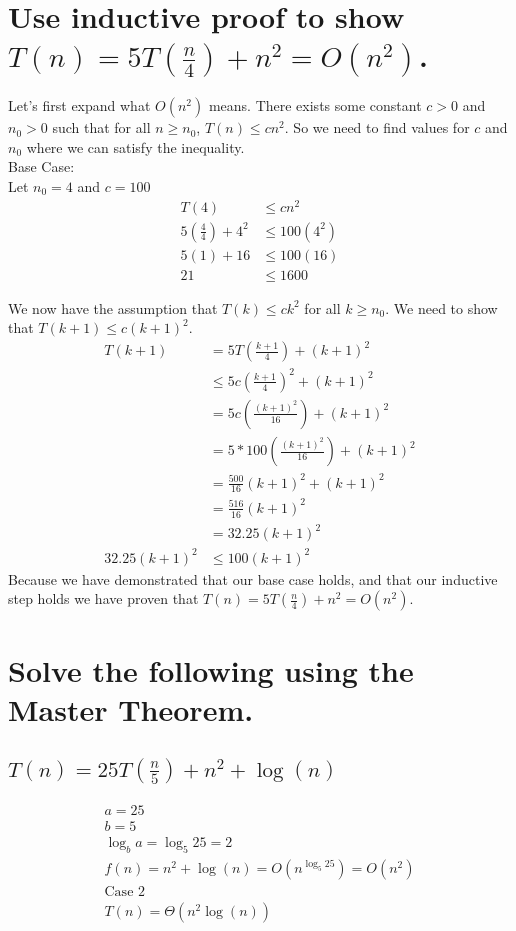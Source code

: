 \documentclass{article}
\begin{document}
\section{Use inductive proof to show \(T(n) = 5T(\frac{n}{4}) + n^2 = O(n^2)\).}
Let's first expand what \(O(n^2)\) means.
There exists some constant \(c > 0\) and \(n_0 > 0\) such that for all \(n \geq n_0\), \(T(n) \leq cn^2\).
So we need to find values for \(c\) and \(n_0\) where we can satisfy the inequality. \\
Base Case: \\
Let \(n_0 = 4\) and \(c = 100\)
\begin{align*}
    T(4) & \leq cn^2 \\
    5(\frac{4}{4}) + 4^2 &\leq 100(4^2) \\
    5(1) + 16 &\leq 100(16)\\
    21 &\leq 1600 
\end{align*}

We now have the assumption that \(T(k) \leq ck^2\) for all \(k \geq n_0\).
We need to show that \(T(k+1) \leq c(k+1)^2\).
\begin{align*}
    T(k+1) &= 5T(\frac{k+1}{4}) + (k+1)^2 \\
           &\leq 5c(\frac{k+1}{4})^2 + (k+1)^2 \\
              &= 5c(\frac{(k+1)^2}{16}) + (k+1)^2 \\
              &= 5*100(\frac{(k+1)^2}{16}) + (k+1)^2 \\
              &= \frac{500}{16}(k+1)^2 + (k+1)^2 \\
              &= \frac{516}{16}(k+1)^2 \\
              &= 32.25(k+1)^2 \\
            32.25(k+1)^2 &\leq 100(k+1)^2
\end{align*}
Because we have demonstrated that our base case holds, and that our inductive step holds
we have proven that \(T(n) = 5T(\frac{n}{4}) + n^2 = O(n^2)\).

\section{Solve the following using the Master Theorem.}
    \subsection{\(T(n) = 25T(\frac{n}{5}) + n^2 + \log(n)\)}
      \begin{align*}
        a = 25 \\
        b = 5 \\
        \log_b{a} = \log_5{25} = 2 \\
        f(n) = n^2 + \log(n) = O(n^{\log_5{25}}) = O(n^2) \\
        \text{Case 2} \\
        T(n) = \Theta(n^2 \log(n))
      \end{align*}
\end{document}
